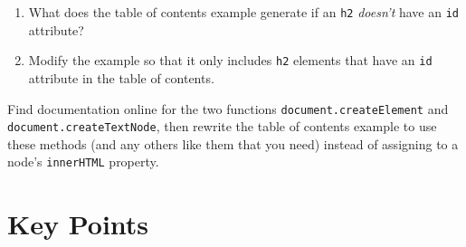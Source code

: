 
\begin{enumerate}
\item
  What does the table of contents example generate if an \texttt{h2} \emph{doesn't} have an \texttt{id} attribute?
\item
  Modify the example so that it only includes \texttt{h2} elements that have an \texttt{id} attribute
  in the table of contents.
\end{enumerate}


Find documentation online for the two functions
\texttt{document.createElement} and \texttt{document.createTextNode},
then rewrite the table of contents example to use these methods
(and any others like them that you need)
instead of assigning to a node's \texttt{innerHTML} property.

\section*{Key Points}



